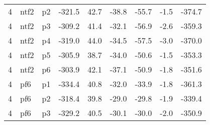 \documentclass[a4paper]{article}
\begin{document}
\begin{table}[ht]
\begin{tabular}{rllrrrrrr}
   4 & ntf2 & p2 & -321.5 & 42.7 & -38.8 & -55.7 & -1.5 & -374.7 \\ 
   4 & ntf2 & p3 & -309.2 & 41.4 & -32.1 & -56.9 & -2.6 & -359.3 \\ 
   4 & ntf2 & p4 & -319.0 & 44.0 & -34.5 & -57.5 & -3.0 & -370.0 \\ 
   4 & ntf2 & p5 & -305.9 & 38.7 & -34.0 & -50.6 & -1.5 & -353.3 \\ 
   4 & ntf2 & p6 & -303.9 & 42.1 & -37.1 & -50.9 & -1.8 & -351.6 \\ 
   4 & pf6 & p1 & -334.4 & 40.8 & -32.0 & -33.9 & -1.8 & -361.3 \\ 
   4 & pf6 & p2 & -318.4 & 39.8 & -29.0 & -29.8 & -1.9 & -339.4 \\ 
   4 & pf6 & p3 & -329.2 & 40.5 & -30.1 & -30.0 & -2.0 & -350.9 \\ 
   \hline
\end{tabular}
\end{table}
\end{document}
